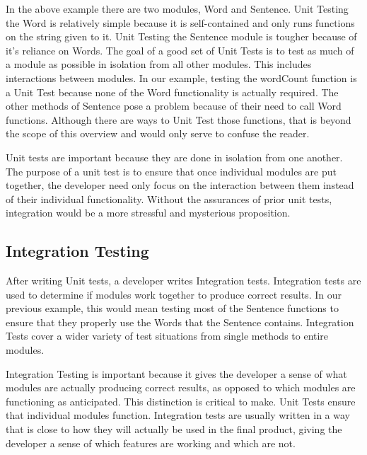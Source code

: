 \documentclass[12pt]{ucthesis}
\begin{document}
In the above example there are two modules, Word and Sentence. Unit Testing the Word is relatively simple because it is self-contained and only runs functions on the string given to it. Unit Testing the Sentence module is tougher because of it's reliance on Words. The goal of a good set of Unit Tests is to test as much of a module as possible in isolation from all other modules. This includes interactions between modules. In our example, testing the wordCount function is a Unit Test because none of the Word functionality is actually required. The other methods of Sentence pose a problem because of their need to call Word functions. Although there are ways to Unit Test those functions, that is beyond the scope of this overview and would only serve to confuse the reader.

Unit tests are important because they are done in isolation from one another. The purpose of a unit test is to ensure that once individual modules are put together, the developer need only focus on the interaction between them instead of their individual functionality. Without the assurances of prior unit tests, integration would be a more stressful and mysterious proposition.

\subsection{Integration Testing}
After writing Unit tests, a developer writes Integration tests. Integration tests are used to determine if modules work together to produce correct results. In our previous example, this would mean testing most of the Sentence functions to ensure that they properly use the Words that the Sentence contains. Integration Tests cover a wider variety of test situations from single methods to entire modules.

Integration Testing is important because it gives the developer a sense of what modules are actually producing correct results, as opposed to which modules are functioning as anticipated. This distinction is critical to make. Unit Tests ensure that individual modules function. Integration tests are usually written in a way that is close to how they will actually be used in the final product, giving the developer a sense of which features are working and which are not.
\end{document}
